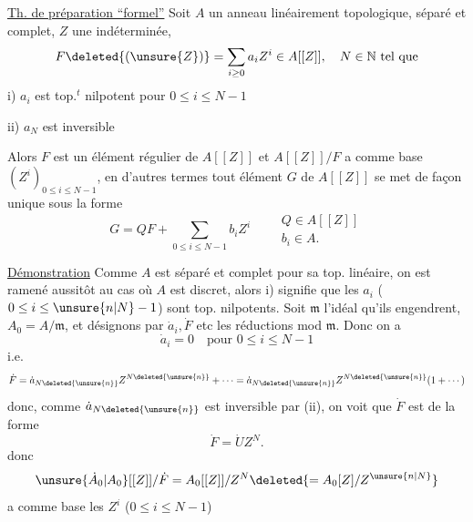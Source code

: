 \uline{Th. de préparation ``formel''} Soit $A$ un anneau linéairement topologique, séparé et complet, $Z$ une indéterminée,
\[
F\deleted{(\unsure{Z})}=\sum_{i\geq0}a_iZ^i\in A[[Z]],\quad N\in\mathbb N\text{ tel que}
\]
i) $a_i$ est top.$^t$ nilpotent pour $0\leq i\leq N-1$

ii) $a_N$ est inversible

Alors $F$ est un élément régulier de $A[[Z]]$ et $A[[Z]]/F$ a comme base $(Z^i)_{0\leq i\leq N-1}$, en d'autres termes tout élément $G$ de $A[[Z]]$ se met de façon unique sous la forme
\[
G=QF+\sum_{0\leq i\leq N-1}b_iZ^i\qquad
\begin{array}{l}Q\in A[[Z]]\\b_i\in A.\end{array}
\]


\uline{Démonstration} Comme $A$ est séparé et complet pour sa top. linéaire, on est ramené aussitôt au cas où $A$ est discret, alors i) signifie que les $a_i$ ($0\leq i\leq\unsure{n|N}-1$) sont top. nilpotents. Soit $\mathfrak m$ l'idéal  qu'ils engendrent, $A_0=A/\mathfrak m$, et désignons par $\dot a_i,\dot F$ etc les réductions mod $\mathfrak m$.  Donc on a 
\[
\dot a_i=0\quad\text{pour }0\leq i\leq N-1
\]
i.e.
\[
\dot F=\dot a_{N\deleted{\unsure{n}}}Z^{N\deleted{\unsure{n}}}+\cdots
=\dot a_{N\deleted{\unsure{n}}}Z^{N\deleted{\unsure{n}}}(1+\cdots)
\]
donc, comme $\dot a_{N\deleted{\unsure{n}}}$ est inversible par (ii), on voit que $\dot F$ est de la forme
\[
\dot F=\dot U Z^N.
\]
 donc
\[
\unsure{\dot A_0|A_0}[[Z]]/\dot F=A_0[[Z]]/Z^N\deleted{=A_0[Z]/Z^{\unsure{n|N}}}
\]
a comme base les $Z^i$ ($0\leq i\leq N-1$)

